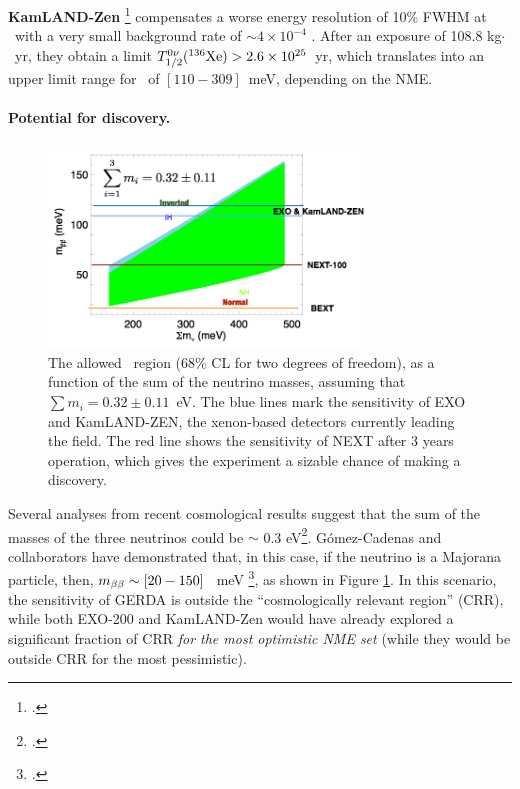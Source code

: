 {\bf KamLAND-Zen} \footcite{TheKamLAND-Zen:2014lma} compensates a worse energy resolution of 10\% FWHM at \Qbb\ with a very small background rate of $\sim 4 \times 10^{-4}$ \ckky. After an exposure of 108.8 kg$\cdot$~yr, they obtain a limit  $T_{1/2}^{0\nu}({}^{136}\rm Xe) > 2.6 \times 10^{25}$~yr, which translates into an upper limit range for \mbb\ of $[110-309]$~meV, depending on the NME.

 \paragraph{Potential for discovery.}
 
\begin{figure}
\centering
\includegraphics[width=0.75\textwidth]{img/SensiCRR.png}
\caption{\small The allowed \mbb\ region (68\% CL for two degrees of freedom), as a function of the sum of the neutrino masses, assuming that 
$\sum m_i = 0.32\pm 0.11$~eV. The blue lines mark the sensitivity of EXO and KamLAND-ZEN, the xenon-based detectors currently leading the field. The red line shows the sensitivity of NEXT after 3 years operation, which gives the experiment a sizable chance of making a discovery.} 
\label{fig.mbb}
\end{figure}

 Several analyses from recent cosmological results suggest that the sum of the masses of the three neutrinos could be $\sim$ 0.3 eV\footcite{PhysRevLett.112.051303}. G\'omez-Cadenas and collaborators have demonstrated that, in this case, if the neutrino is a Majorana particle, then, $m_{\beta\beta} \sim [20-150]$~ meV \footcite{GomezCadenas:2013ue}, as shown in Figure \ref{fig.mbb}. In this scenario, the sensitivity of GERDA is outside the ``cosmologically relevant region'' (CRR), while both EXO-200 and KamLAND-Zen would have already explored a significant fraction of CRR {\em for the most optimistic NME set} (while they would be outside CRR for the most pessimistic). 
 
